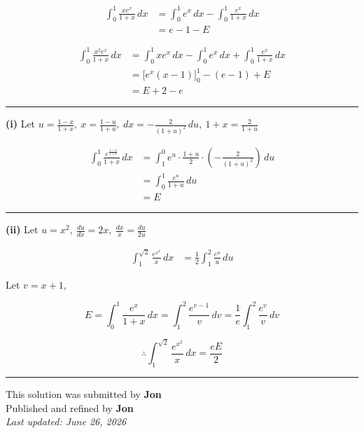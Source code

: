 \documentclass[12pt]{article}
\begin{document}
\newcommand{\ds}{\displaystyle}

\begin{align*}
\int_0^1\frac{xe^x}{1+x}\,dx
&=\int_0^1 e^x\,dx-\int_0^1\frac{e^x}{1+x}\,dx\\
&=e-1-E
\end{align*}



\begin{align*}
\int_0^1\frac{x^2e^x}{1+x}\,dx
&=\int_0^1xe^x\,dx-\int_0^1e^x\,dx+\int_0^1\frac{e^x}{1+x}\,dx\\
&=\bigl[e^x(x-1)\bigr]_0^1-(e-1)+E\\
&=E+2-e
\end{align*}

\bigskip\hrule\bigskip

\textbf{(i)} Let $\ds u=\frac{1-x}{1+x},\ x=\frac{1-u}{1+u},\  dx=-\frac2{(1+u)^2}\,du,\  1+x=\frac2{1+u}$

\begin{align*}
\int_0^1\frac{e^{\frac{1-x}{1+x}}}{1+x}\,dx
&=\int_1^0 e^u\cdot\frac{1+u}{2}\cdot\left(-\frac2{(1+u)^2}\right)\,du\\
&=\int_0^1\frac{e^u}{1+u}\,du\\
&=E
\end{align*}

\bigskip\hrule\bigskip

\textbf{(ii)} Let $\ds u=x^2,\ \frac{du}{dx}=2x,\  \frac{dx}{x}=\frac{du}{2u}$

\begin{align*}
\int_1^{\sqrt2}\frac{e^{x^2}}{x}\,dx
&=\frac12\int_1^2\frac{e^u}{u}\,du
\end{align*}

Let $v=x+1$,

$$E=\int_0^1\frac{e^x}{1+x}\,dx=\int_1^2\frac{e^{v-1}}{v}\,dv=\frac1e\int_1^2\frac{e^v}{v}\,dv$$

$$\therefore \int_1^{\sqrt2}\frac{e^{x^2}}{x}\,dx=\frac{eE}{2}$$

\bigskip
\hrule
\begin{center}
    This solution was submitted by \textbf{Jon}\\[4pt]
    Published and refined by \textbf{Jon}\\[8pt]
    \textit{Last updated: June 26, 2026}
\end{center}
\end{document}
